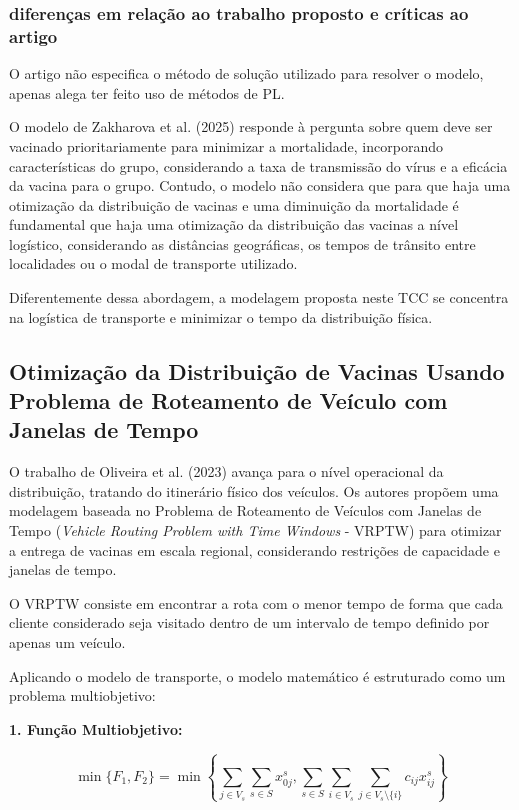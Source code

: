 \subsubsection{diferenças em relação ao trabalho proposto e críticas ao artigo}

O artigo não especifica o método de solução utilizado para resolver o modelo, apenas alega ter feito uso de métodos de PL.

O modelo de Zakharova et al. (2025) responde à pergunta sobre quem deve ser vacinado prioritariamente para minimizar a mortalidade, incorporando características do grupo, considerando a taxa de transmissão do vírus e a eficácia da vacina para o grupo. Contudo, o modelo não considera que para que haja uma otimização da distribuição de vacinas e uma diminuição da mortalidade é fundamental que haja uma otimização da distribuição das vacinas a nível logístico, considerando as distâncias geográficas, os tempos de trânsito entre localidades ou o modal de transporte utilizado.

Diferentemente dessa abordagem, a modelagem proposta neste TCC se concentra na logística de transporte e minimizar o tempo da distribuição física.

\subsection{Otimização da Distribuição de Vacinas Usando Problema de Roteamento de Veículo com Janelas de Tempo}

O trabalho de Oliveira et al. (2023) \cite{oliveira2023optimization} avança para o nível operacional da distribuição, tratando do itinerário físico dos veículos. Os autores propõem uma modelagem baseada no Problema de Roteamento de Veículos com Janelas de Tempo (\textit{Vehicle Routing Problem with Time Windows} - VRPTW) para otimizar a entrega de vacinas em escala regional, considerando restrições de capacidade e janelas de tempo. 

O VRPTW consiste em encontrar a rota com o menor tempo de forma que cada cliente considerado seja visitado dentro de um intervalo de tempo definido por apenas um veículo.

Aplicando o modelo de transporte, o modelo matemático é estruturado como um problema multiobjetivo:

\textbf{1. Função Multiobjetivo:}

\begin{equation}
\min\{F_1, F_2\} = \min \left\{ \sum_{j \in V_s} \sum_{s \in S} x_{0j}^s, \sum_{s \in S} \sum_{i \in V_s} \sum_{j \in V_s \setminus \{i\}} c_{ij}x_{ij}^s \right\}
\end{equation}

